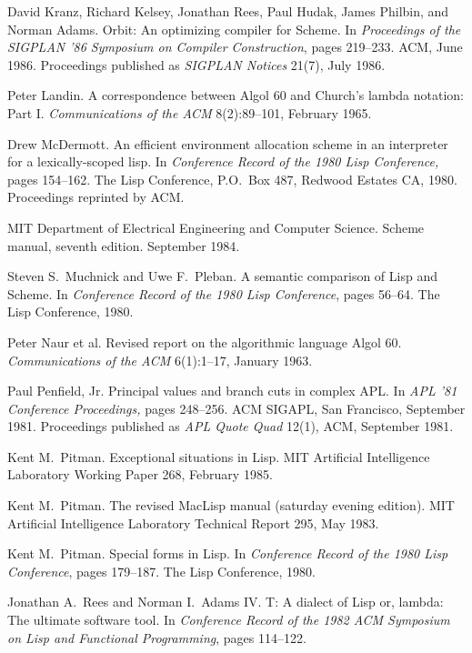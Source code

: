 \begin{thebibliography}{99}
David Kranz, Richard Kelsey, Jonathan Rees, Paul Hudak, James Philbin,
  and Norman Adams.
Orbit: An optimizing compiler for Scheme.
In {\em Proceedings of the SIGPLAN '86 Symposium on Compiler
  Construction}, pages 219--233.
ACM, June 1986.
Proceedings published as {\em SIGPLAN Notices} 21(7), July 1986.

Peter Landin.
A correspondence between Algol 60 and Church's lambda notation: Part I.
{\em Communications of the ACM} 8(2):89--101, February 1965.

Drew McDermott.
An efficient environment allocation scheme in an interpreter for a
  lexically-scoped lisp.
In {\em Conference Record of the 1980 Lisp Conference,} pages
  154--162.
The Lisp Conference, P.O.~Box 487, Redwood Estates CA,
  1980.
Proceedings reprinted by ACM.

MIT Department of Electrical Engineering and Computer Science.
Scheme manual, seventh edition.
September 1984.

Steven S.~Muchnick and Uwe F.~Pleban.
A semantic comparison of Lisp and Scheme.
In {\em Conference Record of the 1980 Lisp Conference}, pages 56--64.
The Lisp Conference, 1980.

Peter Naur et al.
Revised report on the algorithmic language Algol 60.
{\em Communications of the ACM} 6(1):1--17, January 1963.

Paul Penfield, Jr.
Principal values and branch cuts in complex APL.
In {\em APL '81 Conference Proceedings,} pages 248--256.
ACM SIGAPL, San Francisco, September 1981.
Proceedings published as {\em APL Quote Quad} 12(1), ACM, September 1981.

Kent M.~Pitman.
Exceptional situations in Lisp.
MIT Artificial Intelligence Laboratory Working Paper 268, February 1985.

Kent M.~Pitman.
The revised MacLisp manual (saturday evening edition).
MIT Artificial Intelligence Laboratory Technical Report 295, May 1983.

Kent M.~Pitman.
Special forms in Lisp.
In {\em Conference Record of the 1980 Lisp Conference}, pages 179--187.
The Lisp Conference, 1980.

Jonathan A.~Rees and Norman I.~Adams IV.
T: A dialect of Lisp or, lambda: The ultimate software tool.
In {\em Conference Record of the 1982 ACM Symposium on Lisp and
  Functional Programming}, pages 114--122.


\end{thebibliography}
